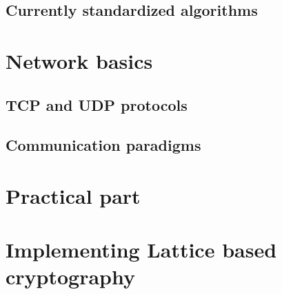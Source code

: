 % 

% 

\section{Currently standardized algorithms}
\label{sec:currently_standardized}


\chapter{Network basics}
\label{ch:network_baics}


\section{TCP and UDP protocols}
\label{sec:tcp_and_udp}


\section{Communication paradigms}
\label{sec:comm_paradigms}


\chapter{Practical part}
\label{ch:pratical_part}


\chapter{Implementing Lattice based cryptography}


